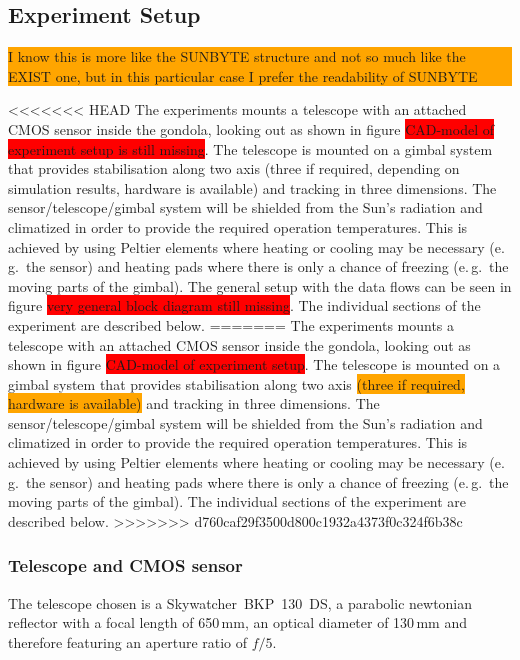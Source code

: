\subsection{Experiment Setup} \label{Experiment_Setup}

\colorbox{orange}{\parbox{\textwidth}{I know this is more like the SUNBYTE structure and not so much like the EXIST one, but in this particular case I prefer the readability of SUNBYTE}}



<<<<<<< HEAD
The experiments mounts a telescope with an attached CMOS sensor inside the gondola, looking out as shown in figure \colorbox{red}{CAD-model of experiment setup is still missing}. The telescope is mounted on a gimbal system that provides stabilisation along two axis (three if required, depending on simulation results, hardware is available) and tracking in three dimensions. The sensor/telescope/gimbal system will be shielded from the Sun's radiation and climatized in order to provide the required operation temperatures. This is achieved by using Peltier elements where heating or cooling may be necessary (e.\,g.~the sensor) and heating pads where there is only a chance of freezing (e.\,g.~the moving parts of the gimbal). The general setup with the data flows can be seen in figure \colorbox{red}{very general block diagram still missing}. The individual sections of the experiment are described below.
=======
The experiments mounts a telescope with an attached CMOS sensor inside the gondola, looking out as shown in figure \colorbox{red}{CAD-model of experiment setup}. The telescope is mounted on a gimbal system that provides stabilisation along two axis \colorbox{orange}{(three if required, hardware is available)} and tracking in three dimensions. The sensor/telescope/gimbal system will be shielded from the Sun's radiation and climatized in order to provide the required operation temperatures. This is achieved by using Peltier elements where heating or cooling may be necessary (e.\,g.~the sensor) and heating pads where there is only a chance of freezing (e.\,g.~the moving parts of the gimbal). The individual sections of the experiment are described below.
>>>>>>> d760caf29f3500d800c1932a4373f0c324f6b38c


\subsubsection{Telescope and CMOS sensor}
The telescope chosen is a Skywatcher~BKP~130~DS, a parabolic newtonian reflector with a focal length of 650\,mm, an optical diameter of 130\,mm and therefore featuring an aperture ratio of $f/5$. 

